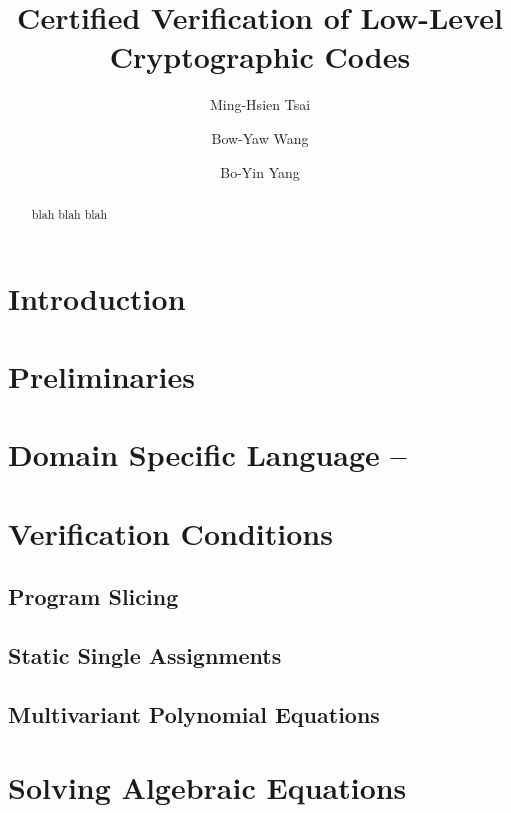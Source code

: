 \documentclass{llncs}
\title{Certified Verification of Low-Level Cryptographic Codes}
\author{
Ming-Hsien Tsai
\and
Bow-Yaw Wang
\and
Bo-Yin Yang
%
}
\institute
{
Institute of Information Science\\
Academia Sinica\\
128 Section 2 Academia Road, Taipei 115-29, Taiwan\\
\email{mhtsai208@gmail.com, bywang@iis.sinica.edu.tw, by@crypto.tw}
}
\author{\vspace*{-1cm} }
\institute{\vspace*{-1cm}\ }
\begin{document}
\maketitle

\begin{abstract}
  blah blah blah
\end{abstract}

\section{Introduction}
\label{section:introduction}


\section{Preliminaries}
\label{section:preliminaries}


\section{Domain Specific Language -- }
\label{section:domain-specific-language}


\section{Verification Conditions}
\label{section:translation}


\subsection{Program Slicing}
\label{subsection:translation:slicing}



\subsection{Static Single Assignments}
\label{subsection:translation:static-single-assignment}



\subsection{Multivariant Polynomial Equations}
\label{subsection:translation:multivariant-polynomial-equations}


\section{Solving Algebraic Equations}
\label{section:solving-algebraic-equations}

\end{document}
